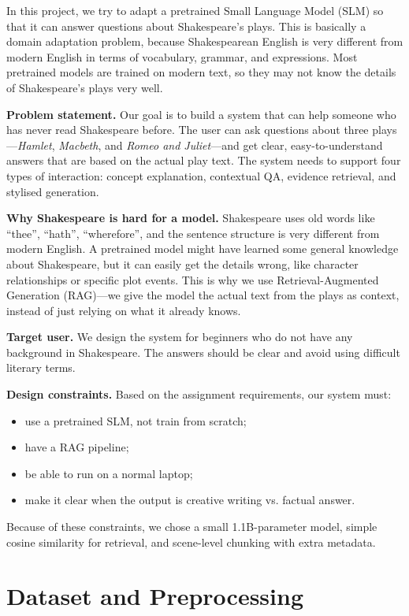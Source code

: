 \documentclass[10pt,conference]{IEEEtran}
\begin{document}
In this project, we try to adapt a pretrained Small Language Model (SLM) so that it can answer questions about Shakespeare's plays. This is basically a domain adaptation problem, because Shakespearean English is very different from modern English in terms of vocabulary, grammar, and expressions. Most pretrained models are trained on modern text, so they may not know the details of Shakespeare's plays very well.

\textbf{Problem statement.} Our goal is to build a system that can help someone who has never read Shakespeare before. The user can ask questions about three plays---\textit{Hamlet}, \textit{Macbeth}, and \textit{Romeo and Juliet}---and get clear, easy-to-understand answers that are based on the actual play text. The system needs to support four types of interaction: concept explanation, contextual QA, evidence retrieval, and stylised generation.

\textbf{Why Shakespeare is hard for a model.} Shakespeare uses old words like ``thee'', ``hath'', ``wherefore'', and the sentence structure is very different from modern English. A pretrained model might have learned some general knowledge about Shakespeare, but it can easily get the details wrong, like character relationships or specific plot events. This is why we use Retrieval-Augmented Generation (RAG)---we give the model the actual text from the plays as context, instead of just relying on what it already knows.

\textbf{Target user.} We design the system for beginners who do not have any background in Shakespeare. The answers should be clear and avoid using difficult literary terms.

\textbf{Design constraints.} Based on the assignment requirements, our system must:
\begin{itemize}
    \item use a pretrained SLM, not train from scratch;
    \item have a RAG pipeline;
    \item be able to run on a normal laptop;
    \item make it clear when the output is creative writing vs. factual answer.
\end{itemize}

Because of these constraints, we chose a small 1.1B-parameter model, simple cosine similarity for retrieval, and scene-level chunking with extra metadata.

\section{Dataset and Preprocessing}
\label{sec:dataset}
\end{document}
